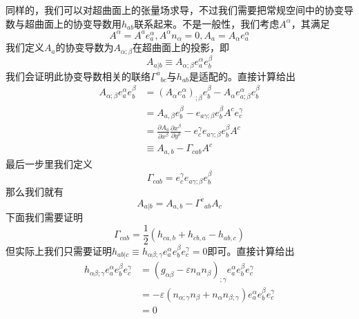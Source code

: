 \documentclass[hyperref, UTF8, a4paper]{ctexart}
\begin{document}
同样的，我们可以对超曲面上的张量场求导，不过我们需要把常规空间中的协变导数与超曲面上的协变导数用$h_{ab}$联系起来。不是一般性，我们考虑$A^{\alpha }$，其满足
\begin{equation*}
	A^{\alpha } =A^{a} e_{a}^{\alpha } ,A^{\alpha } n_{\alpha } =0,A_{a} =A_{\alpha } e_{a}^{\alpha }
\end{equation*}
我们定义$A_{a}$的协变导数为$A_{\alpha ;\beta }$在超曲面上的投影，即
\begin{equation*}
	A_{a|b} \equiv A_{\alpha ;\beta } e_{a}^{\alpha } e_{b}^{\beta }
\end{equation*}
我们会证明此协变导数相关的联络$\Gamma ^{a}{}_{bc}$与$h_{ab}$是适配的。直接计算给出
\begin{equation*}
	\begin{aligned}
		A_{\alpha ;\beta } e_{a}^{\alpha } e_{b}^{\beta } & =(A_{\alpha } e_{a}^{\alpha } )_{;\beta } e_{b}^{\beta } -A_{\alpha } e_{a;\beta }^{\alpha } e_{b}^{\beta }\\
		& =A_{a,\beta } e_{b}^{\beta } -e_{a\gamma ;\beta } e_{b}^{\beta } A^{c} e_{c}^{\gamma }\\
		& =\frac{\partial A_{a}}{\partial x^{\beta }}\frac{\partial x^{\beta }}{\partial y^{b}} -e_{c}^{\gamma } e_{a\gamma ;\beta } e_{b}^{\beta } A^{c}\\
		& \equiv A_{a,b} -\Gamma _{cab} A^{c}
	\end{aligned}
\end{equation*}
最后一步里我们定义
\begin{equation*}
	\Gamma _{cab} =e_{c}^{\gamma } e_{a\gamma ;\beta } e_{b}^{\beta }
\end{equation*}
那么我们就有
\begin{equation*}
	A_{a|b} =A_{a,b} -\Gamma ^{c}{}_{ab} A_{c}
\end{equation*}
下面我们需要证明
\begin{equation*}
	\Gamma _{cab} =\frac{1}{2}( h_{ca,b} +h_{cb,a} -h_{ab,c})
\end{equation*}
但实际上我们只需要证明$h_{ab|c} \equiv h_{\alpha \beta ;\gamma } e_{a}^{\alpha } e_{b}^{\beta } e_{c}^{\gamma } =0$即可。直接计算给出
\begin{equation*}
	\begin{aligned}
		h_{\alpha \beta ;\gamma } e_{a}^{\alpha } e_{b}^{\beta } e_{c}^{\gamma } & =( g_{\alpha \beta } -\varepsilon n_{\alpha } n_{\beta })_{;\gamma } e_{a}^{\alpha } e_{b}^{\beta } e_{c}^{\gamma }\\
		& =-\varepsilon ( n_{\alpha ;\gamma } n_{\beta } +n_{\alpha } n_{\beta ;\gamma }) e_{a}^{\alpha } e_{b}^{\beta } e_{c}^{\gamma }\\
		& =0
	\end{aligned}
\end{equation*}
\end{document}
